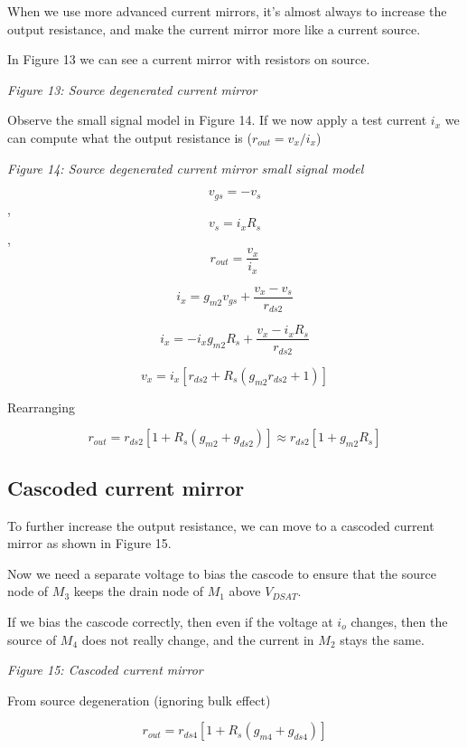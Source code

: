 When we use more advanced current mirrors, it's almost always to
increase the output resistance, and make the current mirror more like a
current source.

In Figure 13 we can see a current mirror with resistors on source.


{
\centering
{}
}

\emph{Figure 13: Source degenerated current mirror }

Observe the small signal model in Figure 14. If we now apply a test
current \(i_x\) we can compute what the output resistance is
(\(r_{out} = v_{x}/i_x\))


{
\centering
{}
}

\emph{Figure 14: Source degenerated current mirror small signal model }

\[v_{gs} = -v_{s}\], \[v_{s} = i_x R_s\], \[r_{out} = \frac{v_x}{i_x}\]

\[i_x = g_{m2} v_{gs} + \frac{v_x - v_s}{r_{ds2}}\]

\[i_x = -i_x g_{m2} R_s + \frac{v_x - i_x R_s}{r_{ds2}}\]

\[v_x = i_x\left[ r_{ds2} + R_s(g_{m2} r_{ds2} + 1)\right]\]

Rearranging

\[ r_{out} =  r_{ds2}[1 + R_s(g_{m2} + g_{ds2})] \approx r_{ds2} [1 + g_{m2}R_s]\]

\subsection{Cascoded current mirror}\label{cascoded-current-mirror}

To further increase the output resistance, we can move to a cascoded
current mirror as shown in Figure 15.

Now we need a separate voltage to bias the cascode to ensure that the
source node of \(M_3\) keeps the drain node of \(M_1\) above
\(V_{DSAT}\).

If we bias the cascode correctly, then even if the voltage at \(i_o\)
changes, then the source of \(M_4\) does not really change, and the
current in \(M_2\) stays the same.


{
\centering
{}
}

\emph{Figure 15: Cascoded current mirror }

From source degeneration (ignoring bulk effect)

\[r_{out} =  r_{ds4}[1 + R_s(g_{m4} + g_{ds4})] \]

